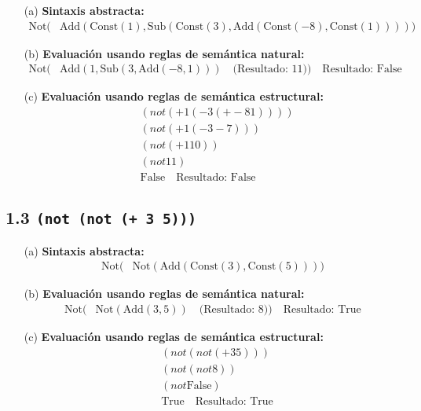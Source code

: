 \documentclass{article}
\begin{document}
\begin{itemize}
    \item[(a)] \textbf{Sintaxis abstracta:}
    \begin{align*}
    \text{Not}(
        &\text{Add}(\text{Const}(1), \text{Sub}(\text{Const}(3), \text{Add}(\text{Const}(-8), \text{Const}(1))))
    )
    \end{align*}

    \item[(b)] \textbf{Evaluación usando reglas de semántica natural:}
    \begin{align*}
    \text{Not}(
        &\text{Add}(1, \text{Sub}(3, \text{Add}(-8, 1))) \quad \text{(Resultado: } 11)
    ) \quad \text{Resultado: } \text{False}
    \end{align*}

    \item[(c)] \textbf{Evaluación usando reglas de semántica estructural:}
    \begin{align*}
    &(not (+ 1 (- 3 (+ -8 1)))) \\
    &(not (+ 1 (- 3 -7))) \\
    &(not (+ 1 10)) \\
    &(not 11) \\
    &\text{False} \quad \text{Resultado: } \text{False}
    \end{align*}
\end{itemize}

\subsection*{1.3 \texttt{(not (not (+ 3 5)))}}

\begin{itemize}
    \item[(a)] \textbf{Sintaxis abstracta:}
    \begin{align*}
    \text{Not}(
        &\text{Not}(\text{Add}(\text{Const}(3), \text{Const}(5)))
    )
    \end{align*}

    \item[(b)] \textbf{Evaluación usando reglas de semántica natural:}
    \begin{align*}
    \text{Not}(
        &\text{Not}(\text{Add}(3, 5)) \quad \text{(Resultado: } 8)
    ) \quad \text{Resultado: } \text{True}
    \end{align*}
    
    \item[(c)] \textbf{Evaluación usando reglas de semántica estructural:}
    \begin{align*}
    &(not (not (+ 3 5))) \\
    &(not (not 8)) \\
    &(not \text{False}) \\
    &\text{True} \quad \text{Resultado: } \text{True}
    \end{align*}
\end{itemize}
\end{document}
